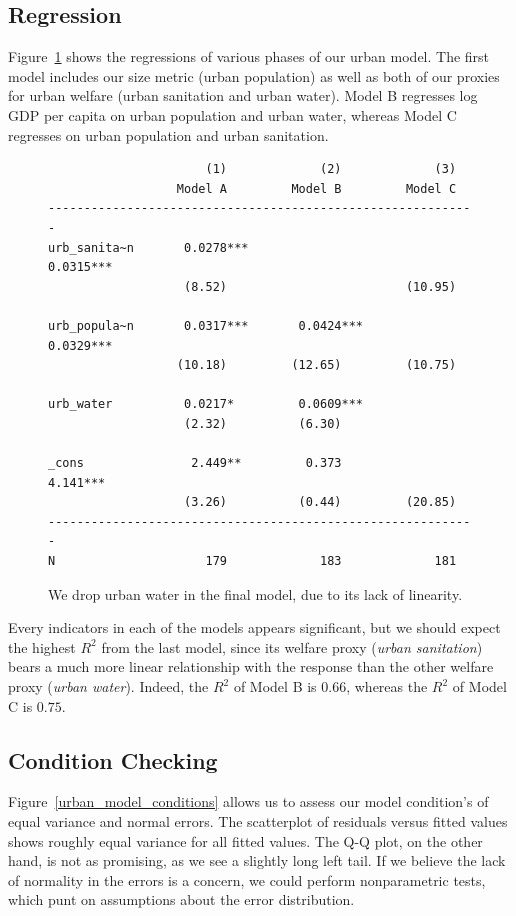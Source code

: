 \documentclass[11pt]{article}
\begin{document}
\subsection{Regression}

Figure~\ref{urban_model_regressions} shows the regressions of various phases of our urban model.
The first model includes our size metric (urban population) as well as both of our proxies for urban welfare (urban sanitation and urban water).
Model B regresses log GDP per capita on urban population and urban water, whereas Model C regresses on urban population and urban sanitation.

\begin{figure}[!ht]
\begin{singlespace}
\begin{verbatim}
                      (1)             (2)             (3)
                  Model A         Model B         Model C
------------------------------------------------------------
urb_sanita~n       0.0278***                       0.0315***
                   (8.52)                         (10.95)

urb_popula~n       0.0317***       0.0424***       0.0329***
                  (10.18)         (12.65)         (10.75)

urb_water          0.0217*         0.0609***
                   (2.32)          (6.30)

_cons               2.449**         0.373           4.141***
                   (3.26)          (0.44)         (20.85)
------------------------------------------------------------
N                     179             183             181
\end{verbatim}
\end{singlespace}
\caption{\label{urban_model_regressions}We drop urban water in the final model, due to its lack of linearity.}
\end{figure}

Every indicators in each of the models appears significant, but we should expect the highest $R^2$ from the last model, since its welfare proxy (\emph{urban sanitation}) bears a much more linear relationship with the response than the other welfare proxy (\emph{urban water}). Indeed, the $R^2$ of Model B is $0.66$, whereas the $R^2$ of Model C is $0.75$.


\subsection{Condition Checking}
Figure~\ref{urban_model_conditions} allows us to assess our model condition's of equal variance and normal errors. The scatterplot of residuals versus fitted values shows roughly equal variance for all fitted values. The Q-Q plot, on the other hand, is not as promising, as we see a slightly long left tail. If we believe the lack of normality in the errors is a concern, we could perform nonparametric tests, which punt on assumptions about the error distribution.
\end{document}
